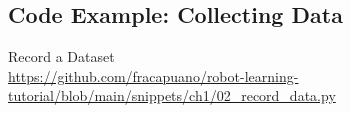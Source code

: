 \subsection{Code Example: Collecting Data}
\label{paragraph:collecting-data}

\begin{pbox}[label={ex:record-dataset}]{Record a Dataset \\ \url{https://github.com/fracapuano/robot-learning-tutorial/blob/main/snippets/ch1/02_record_data.py}}
    
\end{pbox}
